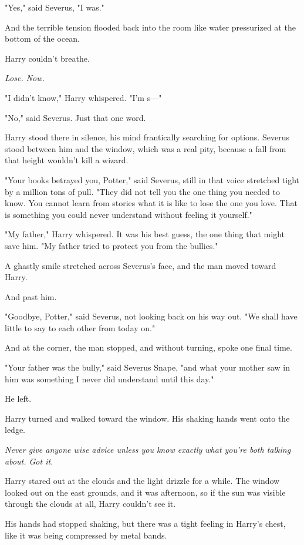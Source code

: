 "Yes," said Severus, "I was."

And the terrible tension flooded back into the room like water pressurized at
the bottom of the ocean.

Harry couldn't breathe.

\emph{Lose. Now.}

"I didn't know," Harry whispered. "I'm s---"

"No," said Severus. Just that one word.

Harry stood there in silence, his mind frantically searching for options.
Severus stood between him and the window, which was a real pity, because a fall
from that height wouldn't kill a wizard.

"Your books betrayed you, Potter," said Severus, still in that voice stretched
tight by a million tons of pull. "They did not tell you the one thing you
needed to know. You cannot learn from stories what it is like to lose the one
you love. That is something you could never understand without feeling it
yourself."

"My father," Harry whispered. It was his best guess, the one thing that might
save him. "My father tried to protect you from the bullies."

A ghastly smile stretched across Severus's face, and the man moved toward Harry.

And past him.

"Goodbye, Potter," said Severus, not looking back on his way out. "We shall
have little to say to each other from today on."

And at the corner, the man stopped, and without turning, spoke one final time.

"Your father was the bully," said Severus Snape, "and what your mother saw in
him was something I never did understand until this day."

He left.

Harry turned and walked toward the window. His shaking hands went onto the
ledge.

\emph{Never give anyone wise advice unless you know exactly what you're both
talking about. Got it.}

Harry stared out at the clouds and the light drizzle for a while. The window
looked out on the east grounds, and it was afternoon, so if the sun was visible
through the clouds at all, Harry couldn't see it.

His hands had stopped shaking, but there was a tight feeling in Harry's chest,
like it was being compressed by metal bands.

